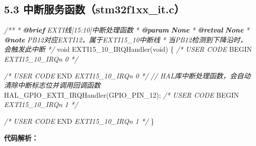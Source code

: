 \documentclass[
  chinese,
  UTF8,
  oneside,
  openany]{ctexbook}
\newenvironment{Shaded}{}{}
\newcommand{\AnnotationTok}[1]{\textcolor[rgb]{0.38,0.63,0.69}{\textbf{\textit{#1}}}}
\newcommand{\CommentTok}[1]{\textcolor[rgb]{0.38,0.63,0.69}{\textit{#1}}}
\newcommand{\CommentVarTok}[1]{\textcolor[rgb]{0.38,0.63,0.69}{\textbf{\textit{#1}}}}
\newcommand{\DataTypeTok}[1]{\textcolor[rgb]{0.56,0.13,0.00}{#1}}
\newcommand{\InformationTok}[1]{\textcolor[rgb]{0.38,0.63,0.69}{\textbf{\textit{#1}}}}
\newcommand{\NormalTok}[1]{#1}
\newcommand{\OperatorTok}[1]{\textcolor[rgb]{0.40,0.40,0.40}{#1}}
\newcommand{\RegionMarkerTok}[1]{#1}
\begin{document}
\subsection{5.3
中断服务函数（stm32f1xx\_it.c）}\label{ux4e2dux65adux670dux52a1ux51fdux6570stm32f1xx_it.c}

\begin{Shaded}
\begin{Highlighting}[]
\CommentTok{/**}
\CommentTok{  * }\AnnotationTok{@brief}\CommentTok{  EXTI线[15:10]中断处理函数}
\CommentTok{  * }\AnnotationTok{@param}\CommentTok{  }\CommentVarTok{None}
\CommentTok{  * }\AnnotationTok{@retval}\CommentTok{ }\CommentVarTok{None}
\CommentTok{  * }\InformationTok{@note}\CommentTok{   PB12对应EXTI12，属于EXTI15\_10中断线}
\CommentTok{  *         当PB12检测到下降沿时，会触发此中断}
\CommentTok{  */}
\DataTypeTok{void}\NormalTok{ EXTI15\_10\_IRQHandler}\OperatorTok{(}\DataTypeTok{void}\OperatorTok{)}
\OperatorTok{\{}
  \CommentTok{/* USER CODE }\RegionMarkerTok{BEGIN}\CommentTok{ EXTI15\_10\_IRQn 0 */}

  \CommentTok{/* USER CODE }\RegionMarkerTok{END}\CommentTok{ EXTI15\_10\_IRQn 0 */}
  \CommentTok{// HAL库中断处理函数，会自动清除中断标志位并调用回调函数}
\NormalTok{  HAL\_GPIO\_EXTI\_IRQHandler}\OperatorTok{(}\NormalTok{GPIO\_PIN\_12}\OperatorTok{);}
  \CommentTok{/* USER CODE }\RegionMarkerTok{BEGIN}\CommentTok{ EXTI15\_10\_IRQn 1 */}

  \CommentTok{/* USER CODE }\RegionMarkerTok{END}\CommentTok{ EXTI15\_10\_IRQn 1 */}
\OperatorTok{\}}
\end{Highlighting}
\end{Shaded}

\textbf{代码解析：}
\end{document}
